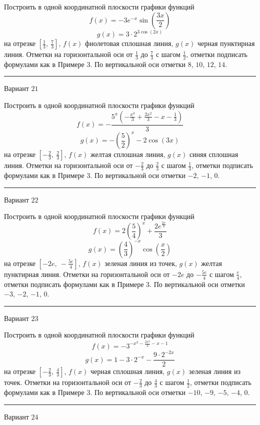 \documentclass[11pt]{report}
\begin{document}
Построить в одной координатной плоскости графики функций $$f(x) = - 3 e^{- x} \sin{\left(\frac{3 x}{2} \right)}$$ $$g(x) = 3 \cdot 2^{3 \cos{\left(2 x \right)}}$$ на отрезке $\left[\frac{1}{3}, \  \frac{7}{3}\right]$, $f(x)$ фиолетовая сплошная линия, $g(x)$ черная пунктирная линия. Отметки на горизонтальной оси от $\frac{1}{3}$ до $\frac{7}{3}$ с шагом $\frac{1}{2}$, отметки подписать формулами как в Примере 3. По вертикальной оси отметки $8$, $10$, $12$, $14$.
\begin{center}
\noindent\rule{8cm}{0.4pt}
\end{center}
Вариант $21$


Построить в одной координатной плоскости графики функций $$f(x) = - \frac{5^{x} \left(- \frac{x^{3}}{3} + \frac{2 x^{2}}{3} - x - \frac{1}{3}\right)}{3}$$ $$g(x) = - \left(\frac{5}{2}\right)^{x} - 2 \cos{\left(3 x \right)}$$ на отрезке $\left[- \frac{2}{3}, \  \frac{2}{3}\right]$, $f(x)$ желтая сплошная линия, $g(x)$ синяя сплошная линия. Отметки на горизонтальной оси от $- \frac{2}{3}$ до $\frac{2}{3}$ с шагом $\frac{1}{3}$, отметки подписать формулами как в Примере 3. По вертикальной оси отметки $-2$, $-1$, $0$.
\begin{center}
\noindent\rule{8cm}{0.4pt}
\end{center}
Вариант $22$


Построить в одной координатной плоскости графики функций $$f(x) = 2 \left(\frac{5}{4}\right)^{x} + \frac{2 e^{\frac{2 x}{3}}}{3}$$ $$g(x) = \left(\frac{4}{3}\right)^{- x} \cos{\left(\frac{x}{2} \right)}$$ на отрезке $\left[- 2 e, \  - \frac{5 e}{4}\right]$, $f(x)$ зеленая линия из точек, $g(x)$ желтая пунктирная линия. Отметки на горизонтальной оси от $- 2 e$ до $- \frac{5 e}{4}$ с шагом $\frac{e}{4}$, отметки подписать формулами как в Примере 3. По вертикальной оси отметки $-3$, $-2$, $-1$, $0$.
\begin{center}
\noindent\rule{8cm}{0.4pt}
\end{center}
Вариант $23$


Построить в одной координатной плоскости графики функций $$f(x) = - 3^{- x^{3} - \frac{2 x^{2}}{3} - x - 1}$$ $$g(x) = 1 - 3 \cdot 2^{- x} - \frac{9 \cdot 2^{- 2 x}}{2}$$ на отрезке $\left[- \frac{2}{3}, \  \frac{4}{3}\right]$, $f(x)$ черная сплошная линия, $g(x)$ зеленая линия из точек. Отметки на горизонтальной оси от $- \frac{2}{3}$ до $\frac{4}{3}$ с шагом $\frac{1}{2}$, отметки подписать формулами как в Примере 3. По вертикальной оси отметки $-10$, $-9$, $-5$, $-4$, $0$.
\begin{center}
\noindent\rule{8cm}{0.4pt}
\end{center}
Вариант $24$
\end{document}

